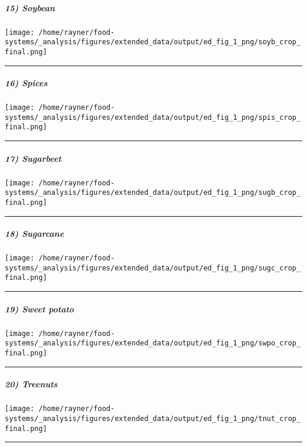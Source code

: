 \documentclass[
]{article}
\begin{document}
\hypertarget{soybean}{%
\subparagraph{15) Soybean}\label{soybean}}

\texttt{[image: /home/rayner/food-systems/\_analysis/figures/extended\_data/output/ed\_fig\_1\_png/soyb\_crop\_final.png]}

\begin{center}\rule{0.5\linewidth}{0.5pt}\end{center}

\hypertarget{spices}{%
\subparagraph{16) Spices}\label{spices}}

\texttt{[image: /home/rayner/food-systems/\_analysis/figures/extended\_data/output/ed\_fig\_1\_png/spis\_crop\_final.png]}

\begin{center}\rule{0.5\linewidth}{0.5pt}\end{center}

\hypertarget{sugarbeet}{%
\subparagraph{17) Sugarbeet}\label{sugarbeet}}

\texttt{[image: /home/rayner/food-systems/\_analysis/figures/extended\_data/output/ed\_fig\_1\_png/sugb\_crop\_final.png]}

\begin{center}\rule{0.5\linewidth}{0.5pt}\end{center}

\hypertarget{sugarcane}{%
\subparagraph{18) Sugarcane}\label{sugarcane}}

\texttt{[image: /home/rayner/food-systems/\_analysis/figures/extended\_data/output/ed\_fig\_1\_png/sugc\_crop\_final.png]}

\begin{center}\rule{0.5\linewidth}{0.5pt}\end{center}

\hypertarget{sweet-potato}{%
\subparagraph{19) Sweet potato}\label{sweet-potato}}

\texttt{[image: /home/rayner/food-systems/\_analysis/figures/extended\_data/output/ed\_fig\_1\_png/swpo\_crop\_final.png]}

\begin{center}\rule{0.5\linewidth}{0.5pt}\end{center}

\hypertarget{treenuts}{%
\subparagraph{20) Treenuts}\label{treenuts}}

\texttt{[image: /home/rayner/food-systems/\_analysis/figures/extended\_data/output/ed\_fig\_1\_png/tnut\_crop\_final.png]}

\begin{center}\rule{0.5\linewidth}{0.5pt}\end{center}
\end{document}
